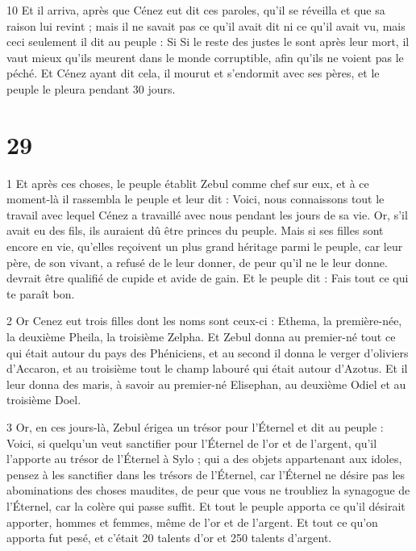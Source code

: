 \par 10 Et il arriva, après que Cénez eut dit ces paroles, qu'il se réveilla et que sa raison lui revint ; mais il ne savait pas ce qu'il avait dit ni ce qu'il avait vu, mais ceci seulement il dit au peuple : Si Si le reste des justes le sont après leur mort, il vaut mieux qu'ils meurent dans le monde corruptible, afin qu'ils ne voient pas le péché. Et Cénez ayant dit cela, il mourut et s'endormit avec ses pères, et le peuple le pleura pendant 30 jours.



\chapter{29}

\par 1 Et après ces choses, le peuple établit Zebul comme chef sur eux, et à ce moment-là il rassembla le peuple et leur dit : Voici, nous connaissons tout le travail avec lequel Cénez a travaillé avec nous pendant les jours de sa vie. Or, s'il avait eu des fils, ils auraient dû être princes du peuple. Mais si ses filles sont encore en vie, qu'elles reçoivent un plus grand héritage parmi le peuple, car leur père, de son vivant, a refusé de le leur donner, de peur qu'il ne le leur donne. devrait être qualifié de cupide et avide de gain. Et le peuple dit : Fais tout ce qui te paraît bon.

\par 2 Or Cenez eut trois filles dont les noms sont ceux-ci : Ethema, la première-née, la deuxième Pheila, la troisième Zelpha. Et Zebul donna au premier-né tout ce qui était autour du pays des Phéniciens, et au second il donna le verger d'oliviers d'Accaron, et au troisième tout le champ labouré qui était autour d'Azotus. Et il leur donna des maris, à savoir au premier-né Elisephan, au deuxième Odiel et au troisième Doel.

\par 3 Or, en ces jours-là, Zebul érigea un trésor pour l'Éternel et dit au peuple : Voici, si quelqu'un veut sanctifier pour l'Éternel de l'or et de l'argent, qu'il l'apporte au trésor de l'Éternel à Sylo ; qui a des objets appartenant aux idoles, pensez à les sanctifier dans les trésors de l'Éternel, car l'Éternel ne désire pas les abominations des choses maudites, de peur que vous ne troubliez la synagogue de l'Éternel, car la colère qui passe suffit. Et tout le peuple apporta ce qu'il désirait apporter, hommes et femmes, même de l'or et de l'argent. Et tout ce qu'on apporta fut pesé, et c'était 20 talents d'or et 250 talents d'argent.

